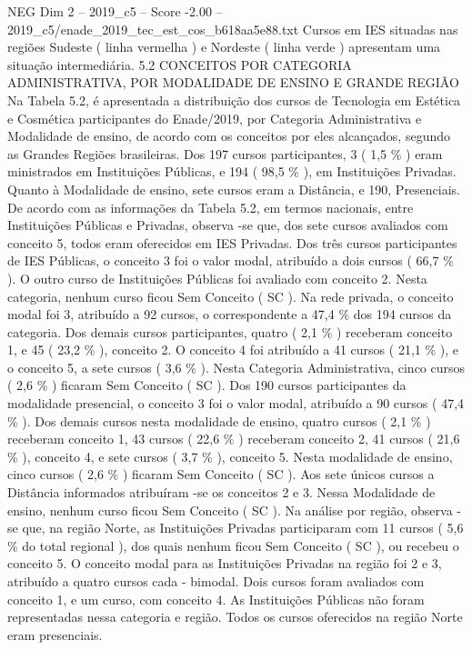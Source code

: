 \begin{textsample}{NEG Dim 2 – 2019\_c5 – Score -2.00 – 2019\_c5/enade\_2019\_tec\_est\_cos\_b618aa5e88.txt}
Cursos em IES situadas nas regiões Sudeste ( linha vermelha ) e Nordeste ( linha verde ) apresentam uma situação intermediária. 5.2 CONCEITOS POR CATEGORIA ADMINISTRATIVA, POR MODALIDADE DE ENSINO E GRANDE REGIÃO Na Tabela 5.2, é apresentada a distribuição dos cursos de Tecnologia em Estética e Cosmética participantes do Enade/2019, por Categoria Administrativa e Modalidade de ensino, de acordo com os conceitos por eles alcançados, segundo as Grandes Regiões brasileiras.
Dos 197 cursos participantes, 3 ( 1,5 \% ) eram ministrados em Instituições Públicas, e 194 ( 98,5 \% ), em Instituições Privadas.
Quanto à Modalidade de ensino, sete cursos eram a Distância, e 190, Presenciais.
De acordo com as informações da Tabela 5.2, em termos nacionais, entre Instituições Públicas e Privadas, observa -se que, dos sete cursos avaliados com conceito 5, todos eram oferecidos em IES Privadas.
Dos três cursos participantes de IES Públicas, o conceito 3 foi o valor modal, atribuído a dois cursos ( 66,7 \% ).
O outro curso de Instituições Públicas foi avaliado com conceito 2.
Nesta categoria, nenhum curso ficou Sem Conceito ( SC ).
Na rede privada, o conceito modal foi 3, atribuído a 92 cursos, o correspondente a 47,4 \% dos 194 cursos da categoria.
Dos demais cursos participantes, quatro ( 2,1 \% ) receberam conceito 1, e 45 ( 23,2 \% ), conceito 2.
O conceito 4 foi atribuído a 41 cursos ( 21,1 \% ), e o conceito 5, a sete cursos ( 3,6 \% ).
Nesta Categoria Administrativa, cinco cursos ( 2,6 \% ) ficaram Sem Conceito ( SC ).
Dos 190 cursos participantes da modalidade presencial, o conceito 3 foi o valor modal, atribuído a 90 cursos ( 47,4 \% ).
Dos demais cursos nesta modalidade de ensino, quatro cursos ( 2,1 \% ) receberam conceito 1, 43 cursos ( 22,6 \% ) receberam conceito 2, 41 cursos ( 21,6 \% ), conceito 4, e sete cursos ( 3,7 \% ), conceito 5.
Nesta modalidade de ensino, cinco cursos ( 2,6 \% ) ficaram Sem Conceito ( SC ).
Aos sete únicos cursos a Distância informados atribuíram -se os conceitos 2 e 3.
Nessa Modalidade de ensino, nenhum curso ficou Sem Conceito ( SC ).
Na análise por região, observa -se que, na região Norte, as Instituições Privadas participaram com 11 cursos ( 5,6 \% do total regional ), dos quais nenhum ficou Sem Conceito ( SC ), ou recebeu o conceito 5.
O conceito modal para as Instituições Privadas na região foi 2 e 3, atribuído a quatro cursos cada - bimodal.
Dois cursos foram avaliados com conceito 1, e um curso, com conceito 4.
As Instituições Públicas não foram representadas nessa categoria e região.
Todos os cursos oferecidos na região Norte eram presenciais.

\end{textsample}
